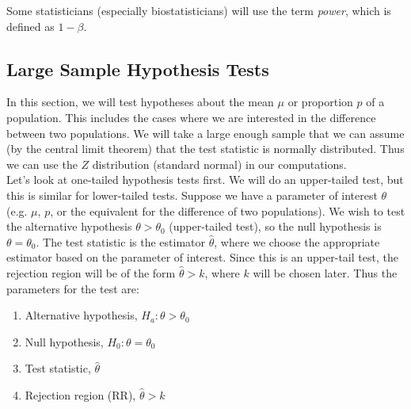 \documentclass[notes.tex]{subfiles}
\begin{document}
Some statisticians (especially biostatisticians) will use the term \emph{power}, which is defined as $1 - \beta$.

\subsection{Large Sample Hypothesis Tests}
In this section, we will test hypotheses about the mean $\mu$ or proportion $p$ of a population. This includes the cases where we are interested in the difference between two populations. We will take a large enough sample that we can assume (by the central limit theorem) that the test statistic is normally distributed. Thus we can use the $Z$ distribution (standard normal) in our computations. \\

Let's look at one-tailed hypothesis tests first. We will do an upper-tailed test, but this is similar for lower-tailed tests. Suppose we have a parameter of interest $\theta$ (e.g. $\mu$, $p$, or the equivalent for the difference of two populations). We wish to test the alternative hypothesis $\theta > \theta_0$ (upper-tailed test), so the null hypothesis is $\theta = \theta_0$. The test statistic is the estimator $\hat{\theta}$, where we choose the appropriate estimator based on the parameter of interest. Since this is an upper-tail test, the rejection region will be of the form $\hat{\theta} > k$, where $k$ will be chosen later. Thus the parameters for the test are:

\begin{enumerate}
\item Alternative hypothesis, $H_a: \theta > \theta_0$
\item Null hypothesis, $H_0: \theta = \theta_0$
\item Test statistic, $\hat{\theta}$
\item Rejection region (RR), $\hat{\theta} > k$
\end{enumerate}
\end{document}
